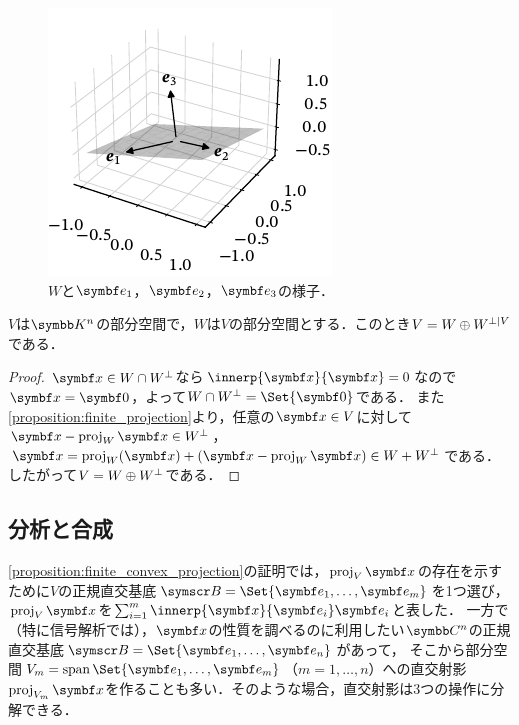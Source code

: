 \documentclass[../../main]{subfiles}
\begin{document}
\begin{figure}[htbp]
  \centering
  \includegraphics{figures/orthogonal_complement.pdf}
  \caption{\(W\)と\(\vect{e}_1\)，\(\vect{e}_2\)，\(\vect{e}_3\)の様子．}
\end{figure}

\begin{proposition}{}{}
  \(V\)は\(\numset{K}^n\)の部分空間で，\(W\)は\(V\)の部分空間とする．このとき\(V=W\oplus\pcomp[V]{W}\)である．
\end{proposition}

\begin{proof}
  \(\vect{x}\in W\cap\pcomp{W}\)なら\(\innerp{\vect{x}}{\vect{x}}=0\)なので\(\vect{x}=\zvec\)，よって\(W\cap\pcomp{W}=\Set{\zvec}\)である．
  また\cref{proposition:finite_projection}より，任意の\(\vect{x}\in V\)に対して\(\vect{x}-\proj_W\vect{x}\in\pcomp{W}\)，\(\vect{x}=\proj_W(\vect{x})+(\vect{x}-\proj_W\vect{x})\in W+\pcomp{W}\)である．
  したがって\(V=W\oplus\pcomp{W}\)である．
\end{proof}

\subsection{分析と合成}
\label{subsection:analysis_and_synthesis}

\cref{proposition:finite_convex_projection}の証明では，\(\proj_V\vect{x}\)の存在を示すために\(V\)の正規直交基底\(\basis{B}=\Set{\vect{e}_1,\dots,\vect{e}_m}\)を1つ選び，\(\proj_V\vect{x}\)を\(\sum_{i=1}^m\innerp{\vect{x}}{\vect{e}_i}\vect{e}_i\)と表した．
一方で（特に信号解析では），\(\vect{x}\)の性質を調べるのに利用したい\(\numset{C}^n\)の正規直交基底\(\basis{B}=\Set{\vect{e}_1,\dots,\vect{e}_n}\)があって，
そこから部分空間\(V_m=\spannedby\Set{\vect{e}_1,\dots,\vect{e}_m}\)（\(m=1,\dots,n\)）への直交射影\(\proj_{V_m}\vect{x}\)を作ることも多い．そのような場合，直交射影は3つの操作に分解できる．
\end{document}
